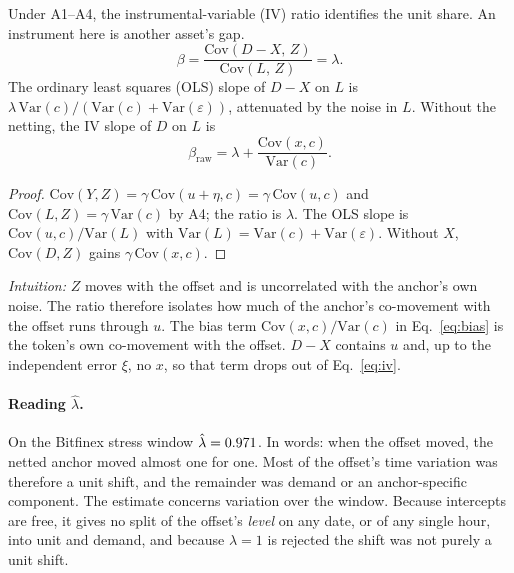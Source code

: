 \begin{proposition}
Under A1--A4, the instrumental-variable (IV) ratio identifies the unit share. An instrument here is another asset's gap.
\begin{equation}
\beta=\frac{\mathrm{Cov}(D-X,\,Z)}{\mathrm{Cov}(L,\,Z)}=\lambda .
\label{eq:iv}
\end{equation}
The ordinary least squares (OLS) slope of $D-X$ on $L$ is $\lambda\,\mathrm{Var}(c)/(\mathrm{Var}(c)+\mathrm{Var}(\varepsilon))$, attenuated by the noise in $L$.
Without the netting, the IV slope of $D$ on $L$ is
\begin{equation}
\beta_{\mathrm{raw}}=\lambda+\frac{\mathrm{Cov}(x,c)}{\mathrm{Var}(c)} .
\label{eq:bias}
\end{equation}
\end{proposition}
\begin{proof}
$\mathrm{Cov}(Y,Z)=\gamma\,\mathrm{Cov}(u+\eta,c)=\gamma\,\mathrm{Cov}(u,c)$ and $\mathrm{Cov}(L,Z)=\gamma\,\mathrm{Var}(c)$ by A4; the ratio is $\lambda$. The
OLS slope is $\mathrm{Cov}(u,c)/\mathrm{Var}(L)$ with $\mathrm{Var}(L)=\mathrm{Var}(c)+\mathrm{Var}(\varepsilon)$. Without $X$, $\mathrm{Cov}(D,Z)$ gains $\gamma\,\mathrm{Cov}(x,c)$.
\end{proof}
\emph{Intuition:} $Z$ moves with the offset and is uncorrelated with the anchor's own noise. The ratio therefore isolates how
much of the anchor's co-movement with the offset runs through $u$. The bias term $\mathrm{Cov}(x,c)/\mathrm{Var}(c)$ in
Eq.~\eqref{eq:bias} is the token's own co-movement with the offset. $D-X$ contains $u$ and, up to the independent
error $\xi$, no $x$, so that term drops out of Eq.~\eqref{eq:iv}.

\paragraph{Reading $\hat\lambda$.} On the Bitfinex stress window $\hat\lambda=0.971{}$. In words: when the
offset moved, the netted anchor moved almost one for one. Most of the offset's time variation was therefore a unit shift, and
the remainder was demand or an anchor-specific component. The estimate concerns variation over the window. Because intercepts are free, it gives no split of the offset's \emph{level} on any
date, or of any single hour, into unit and demand, and because $\lambda=1$ is rejected the shift was not purely a unit shift.

